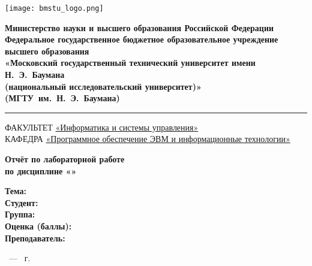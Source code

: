 \thispagestyle{empty}

\begin{titlepage}
	\noindent \begin{minipage}{0.1\textwidth}
	\texttt{[image: bmstu\_logo.png]}
	\end{minipage}
	\noindent\begin{minipage}{0.9\textwidth}\centering
		\textbf{Министерство науки и высшего образования Российской Федерации}\\
		\textbf{Федеральное государственное бюджетное образовательное учреждение высшего образования}\\
		\textbf{«Московский государственный технический университет имени Н.~Э.~Баумана}\\
		\textbf{(национальный исследовательский университет)»}\\
		\textbf{(МГТУ~им.~Н.~Э.~Баумана)}
	\end{minipage}
	
	\vspace{7pt}
	
	\noindent\rule{\textwidth}{2pt}
	
	\vspace{7pt}
	
	\noindent ФАКУЛЬТЕТ \underline{«Информатика и системы управления»} \\
	\noindent КАФЕДРА \underline{«Программное обеспечение ЭВМ и информационные технологии»}
	
	\vspace{2.5cm}
	
	\begin{center}
		\Large\textbf{Отчёт по лабораторной работе } \\ %
		\Large\textbf{по дисциплине «\subjectName»} \\
	\end{center}
	
	\vspace{2.5cm}
	
	\noindent\textbf{Тема:} \underline{\labTheme} \\
	\noindent\textbf{Студент:} \underline{\student} \\
	\noindent\textbf{Группа:} \underline{\group} \\
	\noindent\textbf{Оценка (баллы):} \underline{\hspace{0.2\textwidth}}\\
	\noindent\textbf{Преподаватель:} \underline{\teachers}\\
	
	\vspace*{\fill}
	
	\begin{center}
	\city~--- \the\year{}~г.	
	\end{center}

\end{titlepage}

\newpage

